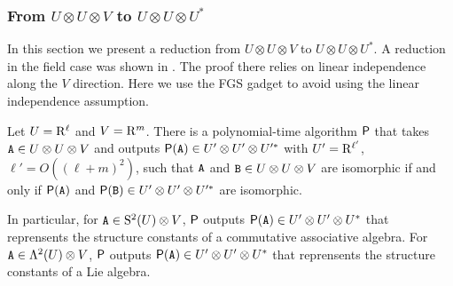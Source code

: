 \subsubsection{From $U\otimes U\otimes V$ to $U\otimes U\otimes U^*$}\label{subsec:UUUstar}

In this section we present a reduction from $U\otimes U\otimes V$ to $U\otimes U\otimes U^*$. A reduction in the field case was shown in \cite[Lemma 6.4]{TI1}. The proof there relies on linear independence along the $V$ direction. Here we use the FGS gadget to avoid using the linear independence assumption.

\begin{theorem} \label{thm:congruence-algebra}
	Let $U=\mathrm{R}^\ell$ and $V=\mathrm{R}^m$. There is a polynomial-time algorithm ${\sf P}$ that takes $\mathtt{A}\in U\otimes U\otimes V$ and outputs ${\sf P}(\mathtt{A})\in U'\otimes U'\otimes U'^*$ with $U'= \mathrm{R}^{\ell'}$, $\ell'=O((\ell+m)^2)$, such that $\mathtt{A}$ and $\mathtt{B}\in U\otimes U\otimes V$ are isomorphic if and only if ${\sf P}(\mathtt{A})$ and ${\sf P}(\mathtt{B})\in U'\otimes U'\otimes U'^*$ are isomorphic.
	
	In particular, for $\mathtt{A}\in \mathrm{S}^2(U)\otimes V$, ${\sf P}$ outputs ${\sf P}(\mathtt{A})\in U'\otimes U'\otimes U^*$ that reprensents the structure constants of a commutative associative algebra. For $\mathtt{A}\in \Lambda^2(U)\otimes V$, ${\sf P}$ outputs ${\sf P}(\mathtt{A})\in U'\otimes U'\otimes U^*$ that reprensents the structure constants of a Lie algebra. 
\end{theorem}
